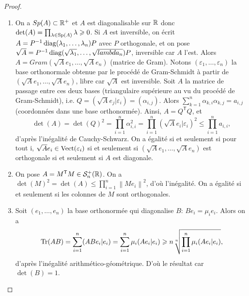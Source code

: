 \documentclass[12pt]{article}
\begin{document}
\begin{proof}
	\phantom{}
	\begin{enumerate}
		\item On a $Sp(A)\subset\mathbb{R}^{+}$ et $A$ est diagonalisable sur $\mathbb{R}$ donc $\det(A)=\prod_{\lambda\in\operatorname{Sp}(A)}\lambda\geqslant 0$. Si $A$ est inversible, on écrit $A=P^{-1}\operatorname{diag}(\lambda_{1},\dots,\lambda_{n})P$ avec $P$ orthogonale, et on pose $\sqrt{A}=P^{-1}\operatorname{diag}(\sqrt{\lambda_{1}},\dots,\sqrt{lambda_{n}})P$, inversible car $A$ l'est. Alors $A=Gram(\sqrt{A}e_1,\dots,\sqrt{A}e_n)$ (matrice de Gram). Notons $(\varepsilon_{1},\dots,\varepsilon_{n})$ la base orthonormale obtenue par le procédé de Gram-Schmidt à partir de $(\sqrt{A}e_{1},\dots,\sqrt{A}e_{n})$, libre car $\sqrt{A}$ est inversible. Soit $A$ la matrice de passage entre ces deux bases (triangulaire supérieure au vu du procédé de Gram-Schmidt), i.e. $Q=(\sqrt{A}e_j|\varepsilon_i)=(\alpha_{i,j})$. Alors $\sum_{k=1}^{n}\alpha_{k,i}\alpha_{k,j}=a_{i,j}$ (coordonnées dans une base orthonormée). Ainsi, $A=Q^{\mathsf{T}}Q$, et
		\begin{equation*}
			\det(A)=\det(Q)^{2}=\prod_{i=1}^{n}\alpha_{i,i}^{2}=\prod_{i=1}^{n}\left(\sqrt{A}e_i|\varepsilon_i\right)^{2}\leqslant\prod_{i=1}^{n}a_{i,i},
		\end{equation*}
		d'après l'inégalité de Cauchy-Schwarz. On a égalité si et seulement si pour tout i, $\sqrt{A}e_i\in\operatorname{Vect}(\varepsilon_i)$ si et seulement si $(\sqrt{A}e_1,\dots,\sqrt{A}e_n)$ est orthogonale si et seulement si $A$ est diagonale.

		\item On pose $A=M^{\mathsf{T}}M\in\mathcal{S}_n^{+}(\mathbb{R})$. On a $\det(M)^{2}=\det(A)\leqslant\prod_{i=1}^{n}\left\lVert Me_{i}\right\rVert^{2}$, d'où l'inégalité. On a égalité si et seulement si les colonnes de $M$ sont orthogonales.
		\item Soit $(e_1,\dots,e_n)$ la base orthonormée qui diagonalise $B$: $Be_i=\mu_i e_i$. Alors on a 
		\begin{equation*}
			\operatorname{Tr}(AB)=\sum_{i=1}^{n}(ABe_i|e_i)=\sum_{i=1}^{n}\mu_i(Ae_i|e_i)\geqslant n\sqrt[n]{\prod_{i=1}^{n}\mu_i(Ae_i|e_i)},
		\end{equation*}
		d'après l'inégalité arithmético-géométrique. D'où le résultat car $\det(B)=1$.
	\end{enumerate}
\end{proof}
\end{document}
